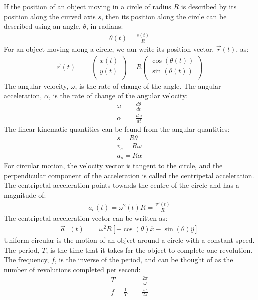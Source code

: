 \begin{chapterSummary}
If the position of an object moving in a circle of radius $R$ is described by its position along the curved axis $s$, then its position along the circle can be described using an angle, $\theta$, in radians:
\begin{align*}
\theta(t)=\frac{s(t)}{R}
\end{align*}
For an object moving along a circle, we can write its position vector, $\vec r(t)$, as:
\begin{align*}
\vec r(t)&= \begin{pmatrix}
          x(t) \\
          y(t) \\
        \end{pmatrix}
        =R \begin{pmatrix}
          \cos(\theta(t)) \\
          \sin(\theta(t)) \\
        \end{pmatrix}
\end{align*}
The angular velocity, $\omega$, is the rate of change of the angle. The angular acceleration, $\alpha$, is the rate of change of the angular velocity:
\begin{align*}
\omega &= \frac{d\theta}{dt}\\
\alpha &= \frac{d\omega}{dt}
\end{align*}
The linear kinematic quantities can be found from the angular quantities:
\begin{align*}
s=R\theta\\
v_s=R\omega\\
a_s=R\alpha
\end{align*}
For circular motion, the velocity vector is tangent to the circle, and the perpendicular component of the acceleration is called the centripetal acceleration. The centripetal acceleration points towards the centre of the circle and has a magnitude of:
\begin{align*}
a_c(t) = \omega^2(t)R = \frac{v^2(t)}{R}
\end{align*}
The centripetal acceleration vector can be written as:
\begin{align*}
\vec a_{\bot}(t)&=\omega^2 R[-\cos(\theta)\hat x-\sin(\theta)\hat y]
\end{align*}
Uniform circular is the motion of an object around a circle with a constant speed. The period, $T$, is the time that it takes for the object to complete one revolution. The frequency, $f$, is the inverse of the period, and can be thought of as the number of revolutions completed per second:
\begin{align*}
T&=\frac{2\pi}{\omega}\\
f=\frac{1}{T}&=\frac{\omega}{2\pi}
\end{align*}
\end{chapterSummary}


